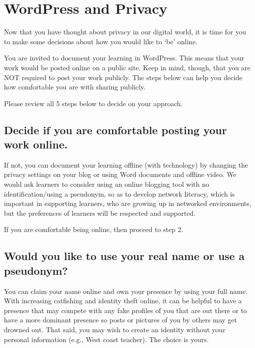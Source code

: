 \documentclass[
]{book}
\begin{document}
\hypertarget{wordpress-and-privacy}{%
\section{WordPress and Privacy}\label{wordpress-and-privacy}}

Now that you have thought about privacy in our digital world, it is time for you to make some decisions about how you would like to `be' online.

You are invited to document your learning in WordPress. This means that your work would be posted online on a public site. Keep in mind, though, that you are NOT required to post your work publicly. The steps below can help you decide how comfortable you are with sharing publicly.

Please review all 5 steps below to decide on your approach.

\hypertarget{decide-if-you-are-comfortable-posting-your-work-online.}{%
\subsection*{Decide if you are comfortable posting your work online.}\label{decide-if-you-are-comfortable-posting-your-work-online.}}

If not, you can document your learning offline (with technology) by changing the privacy settings on your blog or using Word documents and offline video. We would ask learners to consider using an online blogging tool with no identification/using a pseudonym, so as to develop network literacy, which is important in supporting learners, who are growing up in networked environments, but the preferences of learners will be respected and supported.

If you are comfortable being online, then proceed to step 2.

\hypertarget{would-you-like-to-use-your-real-name-or-use-a-pseudonym}{%
\subsection*{Would you like to use your real name or use a pseudonym?}\label{would-you-like-to-use-your-real-name-or-use-a-pseudonym}}

You can claim your name online and own your presence by using your full name. With increasing catfishing and identity theft online, it can be helpful to have a presence that may compete with any fake profiles of you that are out there or to have a more dominant presence so posts or pictures of you by others may get drowned out. That said, you may wish to create an identity without your personal information (e.g., West coast teacher). The choice is yours.
\end{document}
